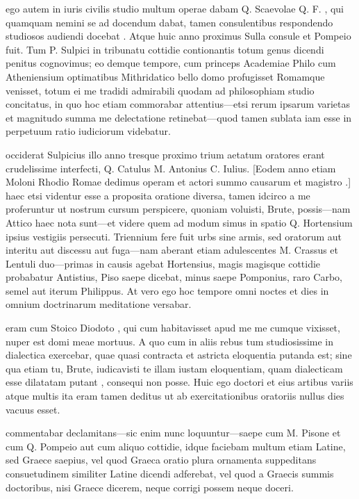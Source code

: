  ego autem in iuris civilis studio multum operae dabam Q. Scaevolae Q. F. , qui quamquam nemini se ad docendum dabat, tamen consulentibus respondendo studiosos audiendi docebat . Atque huic anno proximus Sulla consule et Pompeio fuit. Tum P. Sulpici in tribunatu cottidie contionantis totum genus dicendi penitus cognovimus; eo demque tempore, cum princeps Academiae Philo cum Atheniensium optimatibus Mithridatico bello domo profugisset Romamque venisset, totum ei me tradidi admirabili quodam ad philosophiam studio concitatus, in quo hoc etiam commorabar attentius—etsi rerum ipsarum varietas et magnitudo summa me delectatione retinebat—quod tamen sublata iam esse in perpetuum ratio iudiciorum videbatur.

 occiderat Sulpicius illo anno tresque proximo trium aetatum oratores erant crudelissime interfecti, Q. Catulus M. Antonius C. Iulius. [Eodem anno etiam Moloni Rhodio Romae dedimus operam et actori summo causarum et magistro .] haec etsi videntur esse a proposita oratione diversa, tamen idcirco a me proferuntur ut nostrum cursum perspicere, quoniam voluisti, Brute, possis—nam Attico haec nota sunt—et videre quem ad modum simus in spatio Q. Hortensium ipsius vestigiis persecuti. Triennium fere fuit urbs sine armis, sed oratorum aut interitu aut discessu aut fuga—nam aberant etiam adulescentes M. Crassus et Lentuli duo—primas in causis agebat Hortensius, magis magisque cottidie probabatur Antistius, Piso saepe dicebat, minus saepe Pomponius, raro Carbo, semel aut iterum Philippus. At vero ego hoc tempore omni noctes et dies in omnium doctrinarum meditatione versabar.

 eram cum Stoico Diodoto , qui cum habitavisset apud me me cumque vixisset, nuper est domi meae mortuus. A quo cum in aliis rebus tum studiosissime in dialectica exercebar, quae quasi contracta et astricta eloquentia putanda est; sine qua etiam tu, Brute, iudicavisti te illam iustam eloquentiam, quam dialecticam esse dilatatam putant , consequi non posse. Huic ego doctori et eius artibus variis atque multis ita eram tamen deditus ut ab exercitationibus oratoriis nullus dies vacuus esset.

 commentabar declamitans—sic enim nunc loquuntur—saepe cum M. Pisone et cum Q. Pompeio aut cum aliquo cottidie, idque faciebam multum etiam Latine, sed Graece saepius, vel quod Graeca oratio plura ornamenta suppeditans consuetudinem similiter Latine dicendi adferebat, vel quod a Graecis summis doctoribus, nisi Graece dicerem, neque corrigi possem neque doceri.

